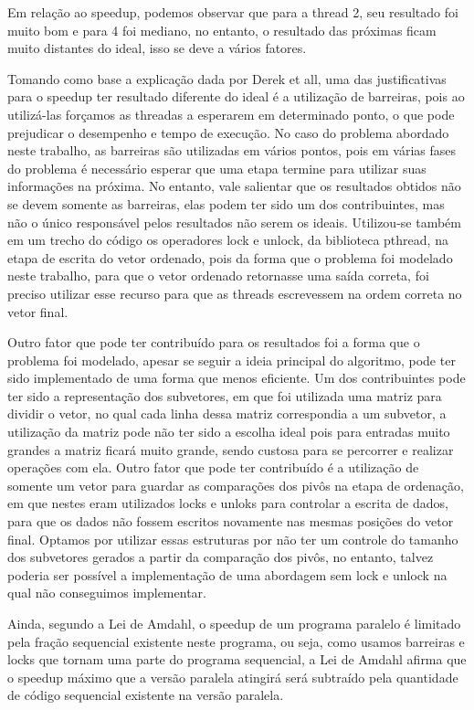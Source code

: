 \documentclass[journal]{IEEEtran}
\begin{document}
Em relação ao speedup, podemos observar que para a thread 2, seu resultado foi muito bom e para 4 foi mediano, no entanto, o resultado das próximas ficam muito distantes do ideal, isso se deve a vários fatores. 

 Tomando como base a explicação dada por Derek et all, uma das justificativas para o speedup ter resultado diferente do ideal é a utilização de barreiras, pois ao utilizá-las forçamos as threadas a esperarem em determinado ponto, o que pode prejudicar o desempenho e tempo de execução. No caso do problema abordado neste trabalho, as barreiras são utilizadas em vários pontos, pois em várias fases do problema é necessário esperar que uma etapa termine para utilizar suas informações na próxima. No entanto, vale salientar que os resultados obtidos não se devem somente as barreiras, elas podem ter sido um dos contribuintes, mas não o único responsável pelos resultados não serem os ideais. Utilizou-se também em um trecho do código os operadores lock e unlock, da biblioteca pthread, na etapa de escrita do vetor ordenado, pois da forma que o problema foi modelado neste trabalho, para que o vetor ordenado retornasse uma saída correta, foi preciso utilizar esse recurso para que as threads escrevessem na ordem correta no vetor final.
 
 Outro fator que pode ter contribuído para os resultados foi a forma que o problema foi modelado, apesar se seguir a ideia principal do algoritmo, pode ter sido implementado de uma forma que menos eficiente. Um dos contribuintes pode ter sido a representação dos subvetores, em que foi utilizada uma matriz para dividir o vetor, no qual cada linha dessa matriz correspondia a um subvetor, a utilização da matriz pode não ter sido a escolha ideal pois para entradas muito grandes a matriz ficará muito grande, sendo custosa para se percorrer e realizar operações com ela. Outro fator que pode ter contribuído é a utilização de somente um vetor para guardar as comparações dos pivôs na etapa de ordenação, em que nestes eram utilizados locks e unloks para controlar a escrita de dados, para que os dados não fossem escritos novamente nas mesmas posições do vetor final. Optamos por utilizar essas estruturas por não ter um controle do tamanho dos subvetores gerados a partir da comparação dos pivôs, no entanto, talvez poderia ser possível a implementação de uma abordagem sem lock e unlock na qual não conseguimos implementar. 
 
 Ainda, segundo a Lei de Amdahl, o speedup de um programa paralelo é limitado pela fração sequencial existente neste programa, ou seja, como usamos barreiras e locks que tornam uma parte do programa sequencial, a Lei de Amdahl afirma que o speedup máximo que a versão paralela atingirá será subtraído pela quantidade de código sequencial existente na versão paralela.
 
\end{document}

